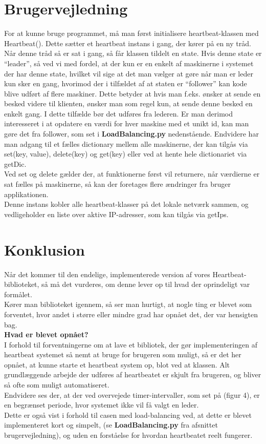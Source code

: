 \documentclass[a4paper,12pt]{article}
\begin{document}
\section{Brugervejledning}
For at kunne bruge programmet, må man først initialisere heartbeat-klassen med Heartbeat(). Dette sætter et heartbeat instans i gang, der kører på en ny tråd.
\\[5px]
Når denne tråd så er sat i gang, så får klassen tildelt en state. Hvis denne state er “leader”, så ved vi med fordel, at der kun er en enkelt af maskinerne i systemet der har denne state, hvilket vil sige at det man vælger at gøre når man er leder kun sker en gang, hvorimod der i tilfældet af at staten er “follower” kan kode blive udført af flere maskiner. Dette betyder at hvis man f.eks. ønsker at sende en besked videre til klienten, ønsker man som regel kun, at sende denne besked en enkelt gang. I dette tilfælde bør det udføres fra lederen. Er man derimod interesseret i at opdatere en værdi for hver maskine med et unikt id, kan man gøre det fra follower, som set i \textbf{LoadBalancing.py} nedenstående.
Endvidere har man adgang til et fælles dictionary mellem alle maskinerne, der kan tilgås via set(key, value), delete(key) og get(key) eller ved at hente hele dictionariet via getDic.
\\
Ved set og delete gælder der, at funktionerne først vil returnere, når værdierne er sat fælles på maskinerne, så kan der foretages flere ændringer fra bruger applikationen.
\\

Denne instans kobler alle heartbeat-klasser på det lokale netværk sammen, og vedligeholder en liste over aktive IP-adresser, som kan tilgås via getIps.
\newpage

\section{Konklusion}
Når det kommer til den endelige, implementerede version af vores Heartbeat-biblioteket, så må det vurderes, om denne lever op til hvad der oprindeligt var formålet.
\\
Kører man biblioteket igennem, så ser man hurtigt, at nogle ting er blevet som forventet, hvor andet i større eller mindre grad har opnået det, der var hensigten bag.
\\[5px]
\textbf{Hvad er blevet opnået?}
\\
I forhold til forventningerne om at lave et bibliotek, der gør implementeringen af heartbeat systemet så nemt at bruge for brugeren som muligt, så er det her opnået, at kunne starte et heartbeat system op, blot ved at klassen.
Alt grundlæggende arbejde der udføres af heartbeatet er skjult fra brugeren, og bliver så ofte som muligt automatiseret.
\\
Endvidere ses der, at der ved overvejede timer-intervaller, som set på (figur 4), er en begrænset periode, hvor systemet ikke vil få valgt en leder.
\\
Dette er også vist i forhold til casen med load-balancing ved, at dette er blevet implementeret kort og simpelt, (se \textbf{LoadBalancing.py} fra afsnittet brugervejledning), og uden en forståelse for hvordan heartbeatet reelt fungerer.
\newpage
\end{document}
